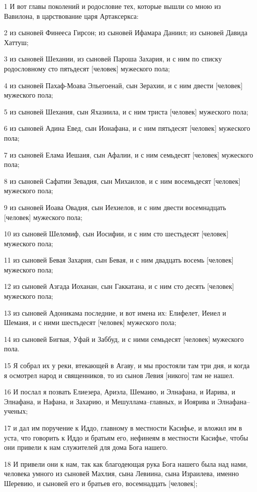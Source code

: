\par 1 И вот главы поколений и родословие тех, которые вышли со мною из Вавилона, в царствование царя Артаксеркса:
\par 2 из сыновей Финееса Гирсон; из сыновей Ифамара Даниил; из сыновей Давида Хаттуш;
\par 3 из сыновей Шехании, из сыновей Пароша Захария, и с ним по списку родословному сто пятьдесят [человек] мужеского пола;
\par 4 из сыновей Пахаф-Моава Эльегоенай, сын Зерахии, и с ним двести [человек] мужеского пола;
\par 5 из сыновей Шехания, сын Яхазиила, и с ним триста [человек] мужеского пола;
\par 6 из сыновей Адина Евед, сын Ионафана, и с ним пятьдесят [человек] мужеского пола;
\par 7 из сыновей Елама Иешаия, сын Афалии, и с ним семьдесят [человек] мужеского пола;
\par 8 из сыновей Сафатии Зевадия, сын Михаилов, и с ним восемьдесят [человек] мужеского пола;
\par 9 из сыновей Иоава Овадия, сын Иехиелов, и с ним двести восемнадцать [человек] мужеского пола;
\par 10 из сыновей Шеломиф, сын Иосифии, и с ним сто шестьдесят [человек] мужеского пола;
\par 11 из сыновей Бевая Захария, сын Бевая, и с ним двадцать восемь [человек] мужеского пола;
\par 12 из сыновей Азгада Иоханан, сын Гаккатана, и с ним сто десять [человек] мужеского пола;
\par 13 из сыновей Адоникама последние, и вот имена их: Елифелет, Иеиел и Шемаия, и с ними шестьдесят [человек] мужеского пола;
\par 14 из сыновей Бигвая, Уфай и Заббуд, и с ними семьдесят [человек] мужеского пола.
\par 15 Я собрал их у реки, втекающей в Агаву, и мы простояли там три дня, и когда я осмотрел народ и священников, то из сынов Левия [никого] там не нашел.
\par 16 И послал я позвать Елиезера, Ариэла, Шемаию, и Элнафана, и Иарива, и Элнафана, и Нафана, и Захарию, и Мешуллама--главных, и Иоярива и Элнафана--ученых;
\par 17 и дал им поручение к Иддо, главному в местности Касифье, и вложил им в уста, что говорить к Иддо и братьям его, нефинеям в местности Касифье, чтобы они привели к нам служителей для дома Бога нашего.
\par 18 И привели они к нам, так как благодеющая рука Бога нашего была над нами, человека умного из сыновей Махлия, сына Левиина, сына Израилева, именно Шеревию, и сыновей его и братьев его, восемнадцать [человек];
